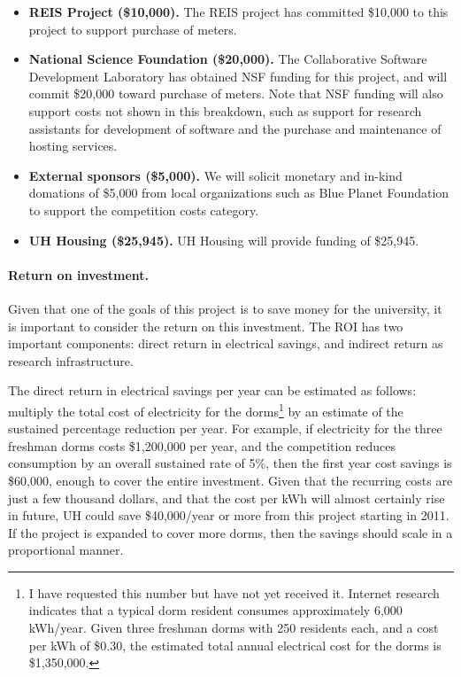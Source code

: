 \documentclass[11pt]{article}
\begin{document}
\begin{itemize}
\item {\bf REIS Project (\$10,000).}  The REIS project has committed \$10,000 to this project to support purchase of meters. 

\item {\bf National Science Foundation (\$20,000).}  The Collaborative Software Development Laboratory has obtained NSF funding for this project, and will commit \$20,000 toward purchase of meters.  Note that NSF funding will also support costs not shown in this breakdown, such as support for research assistants for development of software and the purchase and maintenance of hosting services. 

\item {\bf External sponsors  (\$5,000).}  We will solicit monetary and in-kind domations of \$5,000 from local organizations such as Blue Planet Foundation to support the competition costs category. 

\item {\bf UH Housing  (\$25,945).}  UH Housing will provide funding of \$25,945.
\end{itemize}

\paragraph{Return on investment.}  Given that one of the goals of this
project is to save money for the university, it is important to consider
the return on this investment.  The ROI has two important components:
direct return in electrical savings, and indirect return as research
infrastructure.

The direct return in electrical savings per year can be estimated as
follows: multiply the total cost of electricity for the dorms\footnote{I
  have requested this number but have not yet received it. Internet
  research indicates that a typical dorm resident consumes approximately
  6,000 kWh/year. Given three freshman dorms with 250 residents each, and a
  cost per kWh of \$0.30, the estimated total annual electrical cost for the dorms
  is \$1,350,000.} by an estimate of the sustained percentage reduction per
year.  For example, if electricity for the three freshman dorms costs
\$1,200,000 per year, and the competition reduces consumption by an overall
sustained rate of 5\%, then the first year cost savings is \$60,000, 
enough to cover the entire investment.  Given that the recurring costs are
just a few thousand dollars, and that the cost per kWh will almost
certainly rise in future, UH could save \$40,000/year or more from this
project starting in 2011.  If the project is expanded to cover more dorms,
then the savings should scale in a proportional manner.
\end{document}

